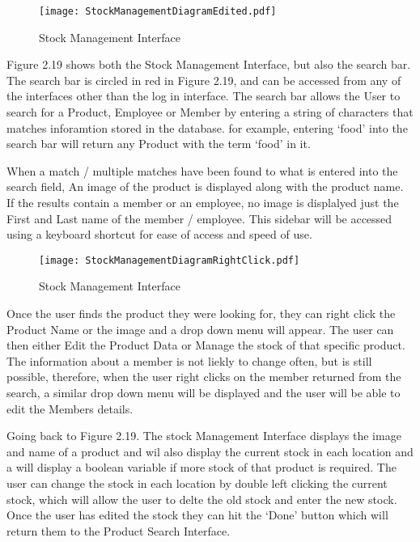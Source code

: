 \begin{figure}[H]
\caption{Stock Management Interface} \label{fig:Stock Management Interface}
\hfill\texttt{[image: StockManagementDiagramEdited.pdf]}\hspace*{\fill}
\end{figure}

Figure 2.19 shows both the Stock Management Interface, but also the search bar. The search bar is circled in red in Figure 2.19, and can be accessed from any of the interfaces other than the log in interface. The search bar allows the User to search for a Product, Employee or Member by entering a string of characters that matches inforamtion stored in the database. for example, entering `food' into the search bar will return any Product with the term `food' in it. \par

  When a match / multiple matches have been found to what is entered into the search field, An image of the product is displayed along with the product name. If the results contain a member or an employee, no image is displalyed just the First and Last name of the member / employee. This sidebar will be accessed using a keyboard shortcut for ease of access and speed of use. \par


\begin{figure}[H]
\caption{Stock Management Interface} \label{fig:Stock Management Interface}
\hfill\texttt{[image: StockManagementDiagramRightClick.pdf]}\hspace*{\fill}
\end{figure}

Once the user finds the product they were looking for, they can right click the Product Name or the image and a drop down menu will appear. The user can then either Edit the Product Data or Manage the stock of that specific product. The information about a member is not liekly to change often, but is still possible, therefore, when the user right clicks on the member returned from the search, a similar drop down menu will be displayed and the user will be able to edit the Members details. \par

Going back to Figure 2.19. The stock Management Interface displays the image and name of a product and wil also display the current stock in each location and a will display a boolean variable if more stock of that product is required. The user can change the stock in each location by double left clicking the current stock, which will allow the user to delte the old stock and enter the new stock. Once the user has edited the stock they can hit the `Done' button which will return them to the Product Search Interface.\par

